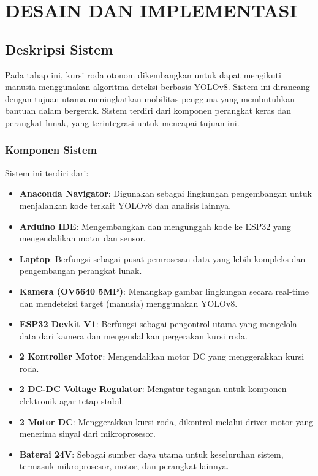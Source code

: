 \chapter{DESAIN DAN IMPLEMENTASI}
\label{chap:desainimplementasi}


\section{Deskripsi Sistem}
\label{sec:deskripsisistem}

Pada tahap ini, kursi roda otonom dikembangkan untuk dapat mengikuti manusia menggunakan algoritma deteksi berbasis YOLOv8. Sistem ini dirancang dengan tujuan utama meningkatkan mobilitas pengguna yang membutuhkan bantuan dalam bergerak. Sistem terdiri dari komponen perangkat keras dan perangkat lunak, yang terintegrasi untuk mencapai tujuan ini.

\subsection{Komponen Sistem}
\label{subsec:komponensistem}

Sistem ini terdiri dari:

\begin{itemize}
    \item \textbf{Anaconda Navigator}: Digunakan sebagai lingkungan pengembangan untuk menjalankan kode terkait YOLOv8 dan analisis lainnya.
    \item \textbf{Arduino IDE}: Mengembangkan dan mengunggah kode ke ESP32 yang mengendalikan motor dan sensor.
    \item \textbf{Laptop}: Berfungsi sebagai pusat pemrosesan data yang lebih kompleks dan pengembangan perangkat lunak.
    \item \textbf{Kamera (OV5640 5MP)}: Menangkap gambar lingkungan secara real-time dan mendeteksi target (manusia) menggunakan YOLOv8.
    \item \textbf{ESP32 Devkit V1}: Berfungsi sebagai pengontrol utama yang mengelola data dari kamera dan mengendalikan pergerakan kursi roda.
    \item \textbf{2 Kontroller Motor}: Mengendalikan motor DC yang menggerakkan kursi roda.
    \item \textbf{2 DC-DC Voltage Regulator}: Mengatur tegangan untuk komponen elektronik agar tetap stabil.
    \item \textbf{2 Motor DC}: Menggerakkan kursi roda, dikontrol melalui driver motor yang menerima sinyal dari mikroprosesor.
    \item \textbf{Baterai 24V}: Sebagai sumber daya utama untuk keseluruhan sistem, termasuk mikroprosesor, motor, dan perangkat lainnya.
\end{itemize}

